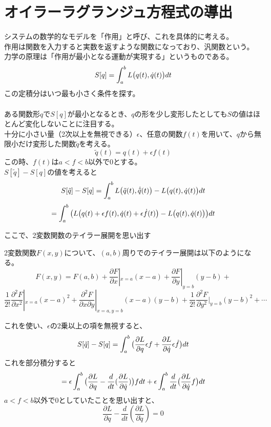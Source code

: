 \documentclass[dvipdfmx]{report} %
\begin{document}
\section{
    オイラーラグランジュ方程式の導出
}
システムの数学的なモデルを「作用」と呼び、これを具体的に考える。\\
作用は関数を入力すると実数を返すような関数になっており、汎関数という。\\
力学の原理は「作用が最小となる運動が実現する」というものである。\\
$$S[q]=\int^{b}_{a}{L\bigl{(}q(t),\dot{q}(t)\bigr{)}dt}$$
この定積分はいつ最も小さく条件を探す。\\
\\
ある関数形$q$で$S[q]$が最小となるとき、$q$の形を少し変形したとしても$S$の値はほとんど変化しないことに注目する。\\
十分に小さい量（2次以上を無視できる）$\epsilon$、任意の関数$f(t)$を用いて、$q$から無限小だけ変形した関数$\tilde{q}$を考える。\\
$$
\tilde{q}(t)=q(t)+\epsilon f(t)
$$
この時、$f(t)$は$a < f < b$以外で$0$とする。\\
$S[\tilde q]-S[q]$の値を考えると
$$
S[\tilde q]- S[q] = \int^{b}_{a}
{ L \bigl{(}\tilde q(t), \dot{\tilde q}(t)\bigr{)} - L\bigl{(}q(t), \dot{q}(t)\bigr{)}dt}
$$
$$
= \int^{b}_{a}
{ \bigl{(} L\bigl{(}q(t)+\epsilon f(t), \dot{q}(t)+\epsilon \dot{f}(t)\bigr{)} - L\bigl{(}q(t), \dot{q}(t)\bigr{)} \bigr{)}dt}
$$

ここで、2変数関数のテイラー展開を思い出す
\begin{tcolorbox}[title=2変数関数のテイラー展開]
    2変数関数$F(x,y)$について、$(a,b)$周りでのテイラー展開は以下のようになる。
    $$
    F(x,y) = F(a,b) + \frac{\partial F}{\partial x}|_{x=a}(x-a) + \frac{\partial F}{\partial y}|_{y=b}(y-b) +
    $$
    $$
    \frac{1}{2!}\frac{\partial^2 F}{\partial x^2}|_{x=a}(x-a)^2 + \frac{\partial^2 F}{\partial x \partial y}|_{x=a,y=b}(x-a)(y-b) + \frac{1}{2!}\frac{\partial^2 F}{\partial y^2}|_{y=b}(y-b)^2 + \cdots
    $$
\end{tcolorbox}
これを使い、$\epsilon$の2乗以上の項を無視すると、
$$
S[\tilde q]- S[q] = \int^{b}_{a}
{ \bigl{(} \frac{\partial L}{\partial q}\epsilon f +  \frac{\partial L}{\partial \dot{q}}\epsilon \dot{f} \bigr{)} dt }
$$
これを部分積分すると
$$
= \epsilon \int_{a}^{b}{ \bigl{(} \frac{\partial L}{\partial q} - \frac{d}{dt} (\frac{\partial L}{\partial \dot{q}}) \bigr{)} f dt} + 
\epsilon \int_{a}^{b}{ \frac{d}{dt} \bigl{(} \frac{\partial L}{\partial \dot{q}} f \bigr{)} dt}
$$
$a < f < b$以外で$0$としていたことを思い出すと、
$$
\frac{\partial L}{\partial q} - \frac{d}{dt} (\frac{\partial L}{\partial \dot{q}}) = 0
$$
\end{document}
